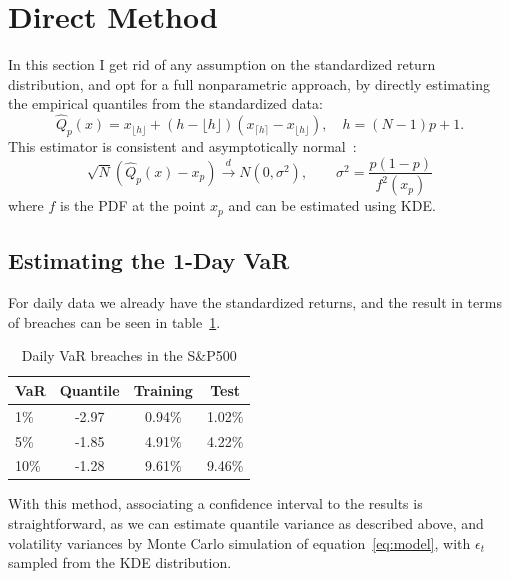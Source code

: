 \documentclass[11pt]{article}
\begin{document}
    \section{Direct Method} \label{sec:direct}
    In this section I get rid of any assumption on the standardized return distribution, and opt for a full nonparametric approach,
    by directly estimating the empirical quantiles from the standardized data:
    \begin{equation}
        \hat Q_p(x) = x_{\lfloor h \rfloor} + (h-\lfloor h \rfloor) (x_{\lceil h \rceil}-x_{\lfloor h \rfloor}), \quad h = (N-1)p+1.
        \label{eq:empirical_quantiles}
    \end{equation}
    This estimator is consistent and asymptotically normal~\parencite{david2003order}:
    \begin{equation}
        \sqrt{N}\left( \hat Q_p(x) - x_p \right)\xrightarrow{d} N(0, \sigma^2), \qquad \sigma^2=\frac{p(1-p)}{f^2(x_p)}
        \label{eq:quantile_variance_equation}
    \end{equation}
    where $f$ is the PDF at the point $x_p$ and can be estimated using KDE\@.

    \subsection{Estimating the 1-Day VaR}
    \label{subsec:estimating-the-1-day-var}
    For daily data we already have the standardized returns, and the result in terms of breaches can be seen in table~\ref{tab:direct_var_breaches}.
    \begin{table}[h!]
        \centering
        \begin{tabular}{l|ccc}
              \textbf{VaR}   & \textbf{Quantile} & \textbf{Training} & \textbf{Test} \\
              \hline
              1\%   & -2.97   & 0.94\% & 1.02\% \\
              5\%   & -1.85   & 4.91\% & 4.22\% \\
              10\%  & -1.28   & 9.61\% & 9.46\% \\
        \end{tabular}
        \caption{Daily VaR breaches in the S\&P500}
        \label{tab:direct_var_breaches}
    \end{table}
    With this method, associating a confidence interval to the results is straightforward, as we can estimate quantile variance as described above,
    and volatility variances by Monte Carlo simulation of equation~\eqref{eq:model}, with $\epsilon_t$ sampled from the KDE distribution.
\end{document}
